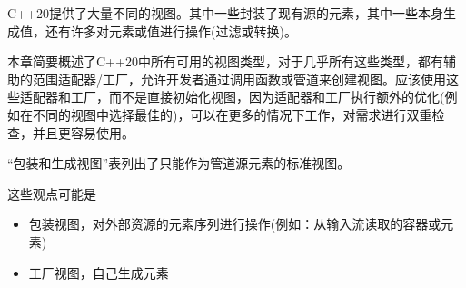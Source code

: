 
C++20提供了大量不同的视图。其中一些封装了现有源的元素，其中一些本身生成值，还有许多对元素或值进行操作(过滤或转换)。

本章简要概述了C++20中所有可用的视图类型，对于几乎所有这些类型，都有辅助的范围适配器/工厂，允许开发者通过调用函数或管道来创建视图。应该使用这些适配器和工厂，而不是直接初始化视图，因为适配器和工厂执行额外的优化(例如在不同的视图中选择最佳的)，可以在更多的情况下工作，对需求进行双重检查，并且更容易使用。


“包装和生成视图”表列出了只能作为管道源元素的标准视图。

这些观点可能是

\begin{itemize}
\item
包装视图，对外部资源的元素序列进行操作(例如：从输入流读取的容器或元素)

\item
工厂视图，自己生成元素
\end{itemize}


